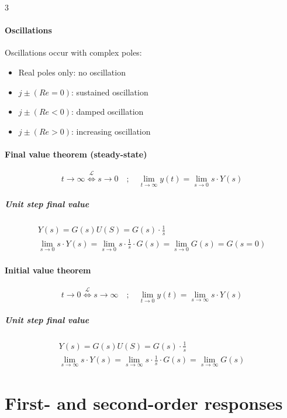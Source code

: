 \documentclass[9pt, landscape, a4paper]{article}
\begin{document}
\begin{multicols*}{3}
\subsection{Oscillations}
Oscillations occur with complex poles:
\vspace*{-.2cm}
\begin{itemize}
    \item Real poles only: no oscillation
    \item $j\pm (Re=0)$: sustained oscillation
    \item $j\pm (Re<0)$: damped oscillation
    \item $j\pm (Re>0)$: increasing oscillation
\end{itemize}
\subsection{Final value theorem (steady-state)}
\[t \to \infty \stackrel{\mathcal{L}}{\Longleftrightarrow} s \to 0\quad ; \quad \boxed{\lim_{t\to\infty} y(t) = \lim_{s\to0} s\cdot Y(s)}\]
\subsubsection{Unit step final value}
\begin{gather*}
    Y(s) = G(s)U(S) = G(s)\cdot \frac{1}{s}\\
    \lim_{s\to0} s\cdot Y(s) = \lim_{s\to 0} s\cdot\frac{1}{s}\cdot G(s) = \lim_{s\to0} G(s) = G(s=0)
\end{gather*}

\subsection{Initial value theorem}
\[t \to 0 \stackrel{\mathcal{L}}{\Longleftrightarrow} s \to \infty\quad ; \quad \boxed{\lim_{t\to0} y(t) = \lim_{s\to\infty} s\cdot Y(s)}\]
\subsubsection{Unit step final value}
\begin{gather*}
    Y(s) = G(s)U(S) = G(s)\cdot \frac{1}{s}\\
    \lim_{s\to\infty} s\cdot Y(s) = \lim_{s\to\infty} s\cdot\frac{1}{s}\cdot G(s) = \lim_{s\to\infty} G(s)
\end{gather*}

\newcolumn
\vspace*{-.6cm}
\part{First- and second-order responses}

\end{multicols*}
\end{document}
